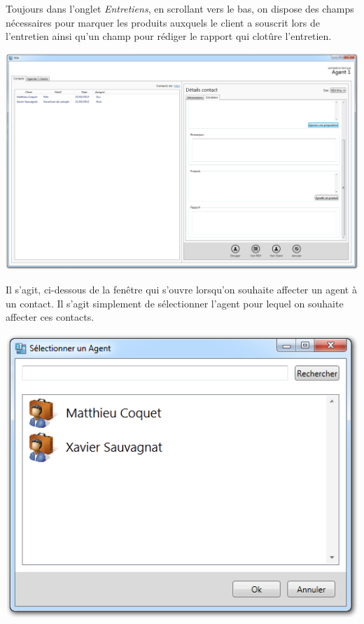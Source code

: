 Toujours dans l'onglet \textit{Entretiens}, en scrollant vers le bas, on dispose des champs nécessaires pour marquer les produits auxquels le client a souscrit lors de l'entretien ainsi qu'un champ pour rédiger le rapport qui clotûre l'entretien.
\medskip
\begin {center}
\includegraphics[width=\textwidth]{../../ihm/pngIHM/ContactEntretiens2.png}
\end {center}
\medskip


Il s'agit, ci-dessous de la fenêtre qui s'ouvre lorsqu'on souhaite affecter un agent à un contact. Il s'agit simplement de sélectionner l'agent pour lequel on souhaite affecter ces contacts.
\medskip
\begin {center}
\includegraphics[width=\textwidth]{../../ihm/pngIHM/ChoixAgent.png}
\end {center}
\medskip


